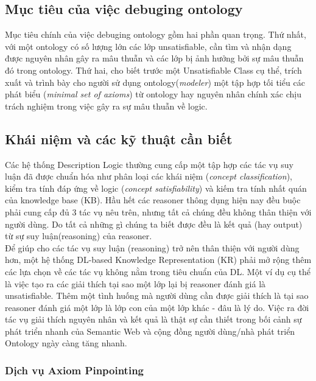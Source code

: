 		
\subsection{Mục tiêu của việc debuging ontology}
Mục tiêu chính của việc debuging ontology gồm hai phần quan trọng. Thứ nhất, với một ontology có số lượng lớn các lớp unsatisfiable, cần tìm và nhận dạng được nguyên nhân gây ra mâu thuẫn và các lớp bị ảnh hưởng bởi sự mâu thuẫn đó trong ontology. Thứ hai, cho biết trước một Unsatisfiable Class cụ thể, trích xuất và trình bày cho người sử dụng ontology(\textit{modeler}) một tập hợp tối tiểu các phát biểu (\textit{minimal set of axioms}) từ ontology hay nguyên nhân chính xác chịu trách nghiệm trong việc gây ra sự mâu thuẫn về logic.
\\
\subsection{Khái niệm và các kỹ thuật cần biết}
Các hệ thống Description Logic thường cung cấp một tập hợp các tác vụ suy luận đã được chuẩn hóa như phân loại các khái niệm (\textit{concept classification}), kiểm tra tính đáp ứng về logic (\textit{concept satisfiability}) và kiếm tra tính nhất quán của knowledge base (KB). Hầu hết các reasoner thông dụng hiện nay đều buộc phải cung cấp đủ 3 tác vụ nêu trên, nhưng tất cả chúng đều không thân thiện với người dùng. Do tất cả những gì chúng ta biết được đều là kết quả (hay output) từ sự suy luận(reasoning) của reasoner. 
\\
\hspace*{0.05\textwidth}  Để giúp cho các tác vụ suy luận (reasoning) trở nên thân thiện với người dùng hơn, một hệ thống DL-based Knowledge Representation (KR) phải mở rộng thêm các lựa chọn về các tác vụ không nằm trong tiêu chuẩn của DL. Một ví dụ cụ thể là việc tạo ra các giải thích tại sao một lớp lại bị reasoner đánh giá là unsatisfiable. Thêm một tình huống mà người dùng cần được giải thích là tại sao reasoner đánh giá một lớp là lớp con của một lớp khác - đâu là lý do. Việc ra đời tác vụ giải thích nguyên nhân và kết quả là thật sự cần thiết trong bối cảnh sự phát triển nhanh của Semantic Web và cộng đồng người dùng/nhà phát triển Ontology ngày càng tăng nhanh.
\subsubsection{Dịch vụ Axiom Pinpointing}
